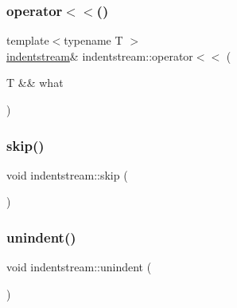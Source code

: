 \mbox{\label{structindentstream_a721a69a93672a46ea80ef2bb83c59201}} 
\subsubsection{\texorpdfstring{operator$<$$<$()}{operator<<()}\hspace{0.1cm}{\footnotesize\ttfamily [2/2]}}
{\footnotesize\ttfamily template$<$typename T $>$ \\
\hyperlink{structindentstream}{indentstream}\& indentstream\+::operator$<$$<$ (\begin{DoxyParamCaption}\item[{T \&\&}]{what }\end{DoxyParamCaption})\hspace{0.3cm}{\ttfamily [inline]}}

\mbox{\label{structindentstream_ada2944223b784a82ed3b52d775155088}} 
\subsubsection{\texorpdfstring{skip()}{skip()}}
{\footnotesize\ttfamily void indentstream\+::skip (\begin{DoxyParamCaption}{ }\end{DoxyParamCaption})\hspace{0.3cm}{\ttfamily [inline]}}

\mbox{\label{structindentstream_a3721933459c8e2ed2cac1de036d6f24d}} 
\subsubsection{\texorpdfstring{unindent()}{unindent()}}
{\footnotesize\ttfamily void indentstream\+::unindent (\begin{DoxyParamCaption}{ }\end{DoxyParamCaption})\hspace{0.3cm}{\ttfamily [inline]}}



